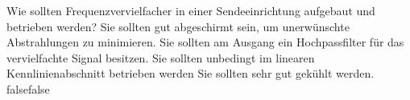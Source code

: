     {Wie sollten Frequenzvervielfacher in einer Sendeeinrichtung aufgebaut und betrieben werden?}
    {Sie sollten gut abgeschirmt sein, um unerwünschte Abstrahlungen zu minimieren.}
    {Sie sollten am Ausgang ein Hochpassfilter für das vervielfachte Signal besitzen.}
    {Sie sollten unbedingt im linearen Kennlinienabschnitt betrieben werden}
    {Sie sollten sehr gut gekühlt werden.}
    {false}{false}